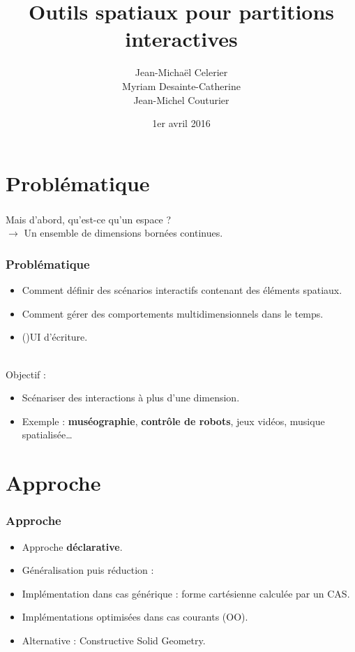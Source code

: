\documentclass{beamer}
\title{Outils spatiaux pour partitions interactives}
\author{Jean-Michaël Celerier\\ Myriam Desainte-Catherine\\ Jean-Michel Couturier}
\date{1er avril 2016}
\begin{document}
\begin{frame}
    \centering
    \maketitle
\end{frame}

\section{Problématique}
\begin{frame}
    \frametitle{}
    \centering\Large
    Mais d'abord, qu'est-ce qu'un espace ?~\\
    \vspace{2cm}
    $\rightarrow$ Un ensemble de dimensions bornées continues.
\end{frame}

\begin{frame}
    \frametitle{Problématique}
    \Large
    \begin{itemize}
        \item Comment définir des scénarios interactifs contenant des éléments spatiaux.
        \item Comment gérer des comportements multidimensionnels dans le temps.
        \item ()UI d'écriture.
    \end{itemize}
    ~\\
    Objectif : 
    
    \begin{itemize}
        \item Scénariser des interactions à plus d'une dimension.
        \item Exemple : \textbf{muséographie}, \textbf{contrôle de robots}, jeux vidéos, musique spatialisée\dots
    \end{itemize}
    
\end{frame}

\section{Approche}
\begin{frame}
    \frametitle{Approche}
    \Large
    \begin{itemize}
        \item Approche \textbf{déclarative}.
        \item Généralisation puis réduction : 
        \item Implémentation dans cas générique : forme cartésienne calculée par un CAS.
        \item Implémentations optimisées dans cas courants (OO). 
        \item Alternative : Constructive Solid Geometry.
    \end{itemize}
\end{frame}
\end{document}
